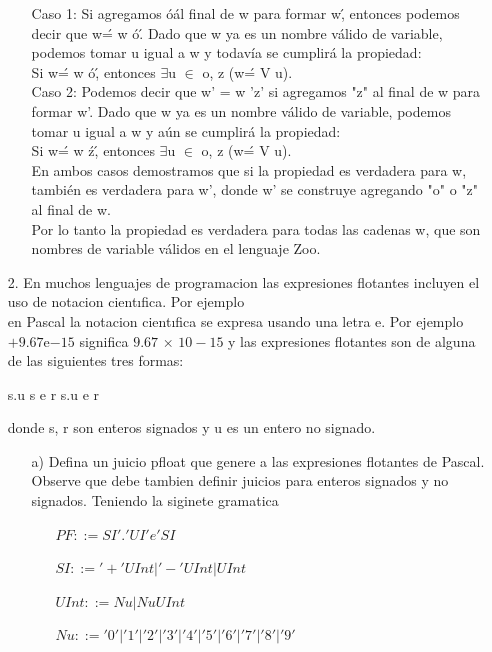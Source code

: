 \documentclass{article}
\begin{document}
\begin{itemize}
\begin{itemize}
                Caso 1: Si agregamos \'o\' al final de w para formar w\', entonces podemos decir que w\' = w \'o\'. Dado que w ya es un nombre válido de variable, podemos tomar u igual a w y todavía se cumplirá la propiedad:\\

                Si w\' = w \'o\', entonces $\exists$u $\in$ o, z (w\' = V u).\\

                Caso 2: Podemos decir que w' = w 'z' si agregamos "z" al final de w para formar w'. Dado que w ya es un nombre válido de variable, podemos tomar u igual a w y aún se cumplirá la propiedad:\\ 

                Si w\' = w \'z\', entonces $\exists$u $\in$ o, z (w\' = V u).\\

                En ambos casos demostramos que si la propiedad es verdadera para w, también es verdadera para w', donde w' se construye agregando "o" o "z" al final de w.\\

                Por lo tanto la propiedad es verdadera para todas las cadenas w, que son nombres de variable válidos en el lenguaje Zoo.
            \end{itemize} 
        \item[2.] En muchos lenguajes de programacion las expresiones flotantes incluyen el uso de notacion cientıfica. Por ejemplo\\
        en Pascal la notacion cientıfica se expresa usando una letra e. Por ejemplo $+9.67$e$-15$ significa $9.67$ × $10-15$ y las expresiones flotantes son de alguna de las siguientes tres formas:
            \begin{center}
                s.u s e r s.u e r
            \end{center}
        donde s, r son enteros signados y u es un entero no signado.
            \begin{itemize}
                \item[a)] Defina un juicio pfloat que genere a las expresiones flotantes de Pascal. Observe que debe tambien definir juicios para enteros signados y no signados.
                Teniendo la siginete gramatica
                \begin{center}
                    \begin{itemize}
                        \item[ ] $PF ::= SI '.' UI 'e' SI$
                        \item[ ] $SI ::= '+' UInt | '-' UInt | UInt$
                        \item[ ] $UInt ::= Nu | Nu UInt$
                        \item[ ] $Nu ::= '0' | '1' | '2' | '3' | '4' | '5' | '6' | '7' | '8' | '9'$
                    \end{itemize}
                \end{center}


\end{itemize}
\end{itemize}
\end{document}
